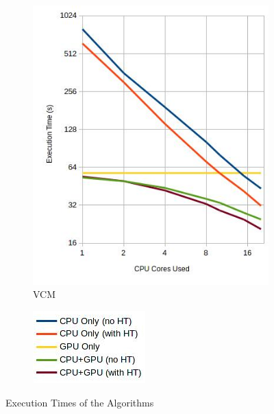 \begin{figure}[H]
\begin{subfigure}[h]{0.45\textwidth}
\includegraphics[width=\textwidth]{img/vcmTexec.jpg}
\caption{\label{img:vcmTexec} VCM}
\end{subfigure}

\begin{subfigure}[h]{0.2\textwidth}
\includegraphics[width=\textwidth]{img/TexecLeg.jpg}
\end{subfigure}

\caption{\label{img:Texec} Execution Times of the Algorithms}

\end{figure}

